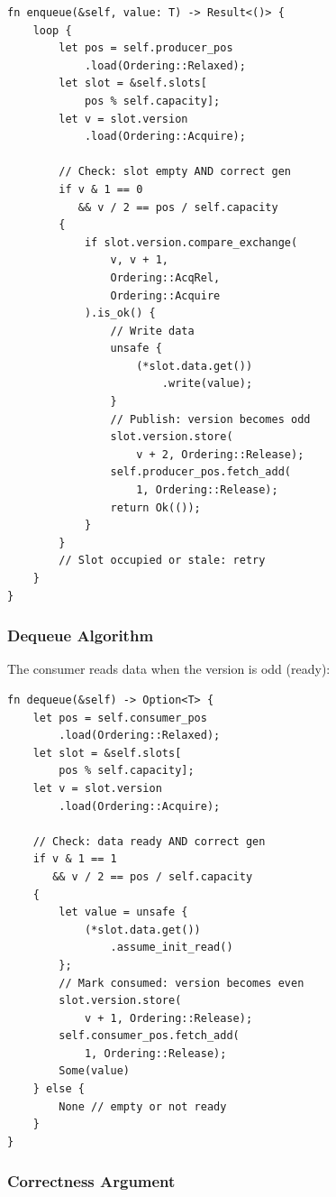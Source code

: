 \documentclass[11pt,a4paper,twocolumn]{article}
\begin{document}
\begin{lstlisting}
fn enqueue(&self, value: T) -> Result<()> {
    loop {
        let pos = self.producer_pos
            .load(Ordering::Relaxed);
        let slot = &self.slots[
            pos % self.capacity];
        let v = slot.version
            .load(Ordering::Acquire);

        // Check: slot empty AND correct gen
        if v & 1 == 0
           && v / 2 == pos / self.capacity
        {
            if slot.version.compare_exchange(
                v, v + 1,
                Ordering::AcqRel,
                Ordering::Acquire
            ).is_ok() {
                // Write data
                unsafe {
                    (*slot.data.get())
                        .write(value);
                }
                // Publish: version becomes odd
                slot.version.store(
                    v + 2, Ordering::Release);
                self.producer_pos.fetch_add(
                    1, Ordering::Release);
                return Ok(());
            }
        }
        // Slot occupied or stale: retry
    }
}
\end{lstlisting}

\subsubsection{Dequeue Algorithm}

The consumer reads data when the version is odd (ready):

\begin{lstlisting}
fn dequeue(&self) -> Option<T> {
    let pos = self.consumer_pos
        .load(Ordering::Relaxed);
    let slot = &self.slots[
        pos % self.capacity];
    let v = slot.version
        .load(Ordering::Acquire);

    // Check: data ready AND correct gen
    if v & 1 == 1
       && v / 2 == pos / self.capacity
    {
        let value = unsafe {
            (*slot.data.get())
                .assume_init_read()
        };
        // Mark consumed: version becomes even
        slot.version.store(
            v + 1, Ordering::Release);
        self.consumer_pos.fetch_add(
            1, Ordering::Release);
        Some(value)
    } else {
        None // empty or not ready
    }
}
\end{lstlisting}

\subsubsection{Correctness Argument}
\end{document}
